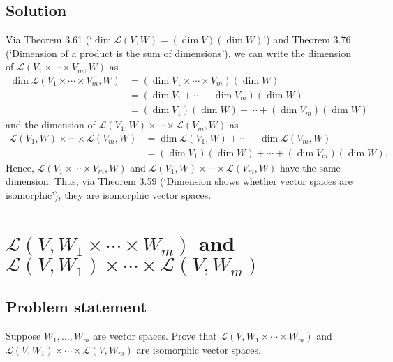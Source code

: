 \documentclass{article}
\begin{document}
\subsection*{Solution}
Via Theorem 3.61 (`$\operatorname{dim}\mathcal{L}(V,W)=(\operatorname{dim}V)(\operatorname{dim}W)$') and Theorem 3.76 (`Dimension of a product is the sum of dimensions'), we can write the dimension of $\mathcal{L}(V_1\times\cdots\times V_m,W)$ as
\begin{align*}
    \operatorname{dim}\mathcal{L}(V_1\times\cdots\times V_m,W)&=(\operatorname{dim}V_1\times\cdots\times V_m)(\operatorname{dim}W)\\
    &=(\operatorname{dim}V_1+\cdots+\operatorname{dim}V_m)(\operatorname{dim}W)\\
    &=(\operatorname{dim}V_1)(\operatorname{dim}W)+\cdots+(\operatorname{dim}V_m)(\operatorname{dim}W)
\end{align*}
and the dimension of $\mathcal{L}(V_1,W)\times\cdots\times\mathcal{L}(V_m,W)$ as
\begin{align*}
    \mathcal{L}(V_1,W)\times\cdots\times\mathcal{L}(V_m,W)&=\operatorname{dim}\mathcal{L}(V_1,W)+\cdots+\operatorname{dim}\mathcal{L}(V_m,W)\\
    &=(\operatorname{dim}V_1)(\operatorname{dim}W)+\cdots+(\operatorname{dim}V_m)(\operatorname{dim}W).
\end{align*}
Hence, $\mathcal{L}(V_1\times\cdots\times V_m,W)$ and $\mathcal{L}(V_1,W)\times\cdots\times\mathcal{L}(V_m,W)$ have the same dimension. Thus, via Theorem 3.59 (`Dimension shows whether vector spaces are isomorphic'), they are isomorphic vector spaces. 

\clearpage

\section{$\mathcal{L}(V,W_1\times\cdots\times W_m)$ and $\mathcal{L}(V,W_1)\times\cdots\times\mathcal{L}(V,W_m)$}
\subsection*{Problem statement}
Suppose $W_1,\ldots,W_m$ are vector spaces. 
Prove that $\mathcal{L}(V,W_1\times\cdots\times W_m)$ and $\mathcal{L}(V,W_1)\times\cdots\times\mathcal{L}(V,W_m)$ are isomorphic vector spaces.
\end{document}
